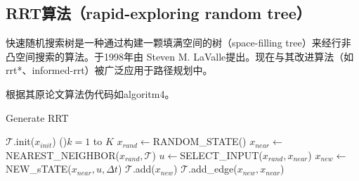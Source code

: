 \documentclass[12pt]{article}
\begin{document}
    \subsection{RRT算法（rapid-exploring random tree）}
    快速随机搜索树是一种通过构建一颗填满空间的树（space-filling tree）来经行非凸空间搜索的算法。于1998年由 Steven M. LaValle提出。现在与其改进算法（如rrt*、informed-rrt）被广泛应用于路径规划中。

    根据其原论文算法伪代码如algoritm4。

    \begin{algorithm}[H]
        \caption{Generate RRT}
        $\mathcal{T}$.init($x_{init}$)\;
        \For(){$k=1$ to $K$}{
            $x_{rand} \gets $RANDOM\_STATE()\;
            $x_{near} \gets $NEAREST\_NEIGHBOR($x_{rand},\mathcal{T}$)\;
            $u \gets $SELECT\_INPUT($x_{rand}, x_{near}$)\;
            $x_{new} \gets$NEW\_sTATE($x_{near},u,\varDelta{t}$)\;
            $\mathcal{T}$.add($x_{new}$)\;
            $\mathcal{T}$.add\_edge($x_{new},x_{near}$)\;
        }
    \end{algorithm}
\end{document}
